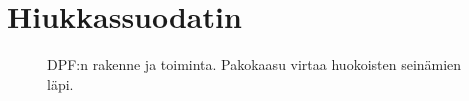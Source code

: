 \chapter{Hiukkassuodatin}%
\label{ch:dpf}

\begin{figure}[H]
    \centering 
    
    \caption{DPF:n rakenne ja toiminta. Pakokaasu virtaa huokoisten seinämien läpi. }
    \label{fig:wall-flow-dpf}
\end{figure}